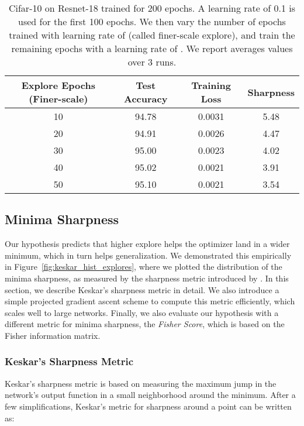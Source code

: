 \documentclass[twoside,11pt]{article}
\begin{document}
\begin{table}[h]
\small
\centering
\caption{Cifar-10 on Resnet-18 trained for 200 epochs. A learning rate of 0.1 is used for the first 100 epochs. We then vary the number of epochs trained with learning rate of  (called finer-scale explore), and train the remaining epochs with a learning rate of . We report averages values over 3 runs.}
\label{tab:finewarmup_accuracy_baseline}
\begin{tabular}{cccc}
\toprule
Explore Epochs (Finer-scale) & Test Accuracy & Training Loss & Sharpness \\
\midrule
  10 & 94.78 & 0.0031 & 5.48\\ 
  20 & 94.91 & 0.0026 & 4.47\\ 
  30 & 95.00 & 0.0023 & 4.02\\ 
  40 & 95.02 & 0.0021 & 3.91\\ 
  50 & 95.10 & 0.0021 & 3.54\\ 
\bottomrule
\end{tabular}
\end{table}
\vspace{-6pt}

\subsection{Minima Sharpness }
\label{sec:metrics_for_wide_minima}
Our hypothesis predicts that higher explore helps the optimizer land in a wider minimum, which in turn helps generalization. We demonstrated this empirically in Figure~\ref{fig:keskar_hist_explores}, where we plotted the distribution of the minima sharpness, as measured by the sharpness metric introduced by \citep{keskar2016large}. In this section, we describe Keskar's sharpness metric in detail.
We also introduce a simple projected gradient ascent scheme to compute this metric efficiently, which scales well to large networks. Finally, we also evaluate our hypothesis with a different metric for minima sharpness, the \textit{Fisher Score}, which is based on the Fisher information matrix.

\subsubsection{Keskar's Sharpness Metric}

Keskar's sharpness metric is based on measuring the maximum jump in the network's output function  in a small neighborhood around the minimum. After a few simplifications, Keskar's metric for sharpness around a point  can be written as:
\end{document}
